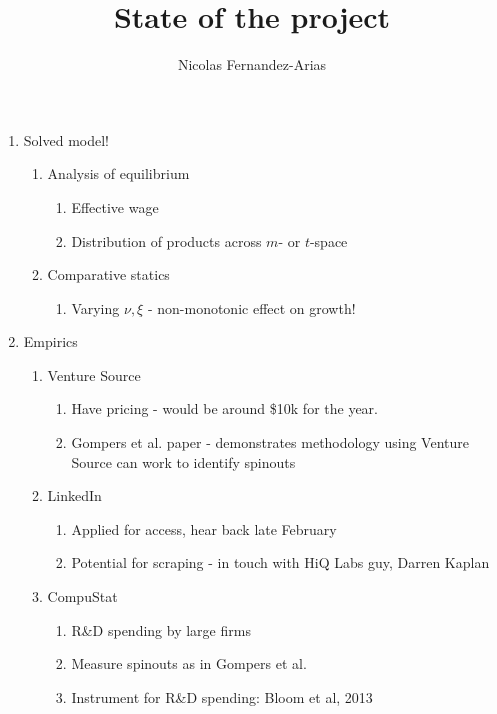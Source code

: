 \documentclass[12pt,english]{article}
\theoremstyle{remark}
\begin{document}
	
\title{State of the project}
\author{Nicolas Fernandez-Arias}
\maketitle


\begin{enumerate}
	\item Solved model!
	\begin{enumerate}
		\item Analysis of equilibrium
		\begin{enumerate}
			\item Effective wage
			\item Distribution of products across $m$- or $t$-space
		\end{enumerate} 
		\item Comparative statics
		\begin{enumerate}
			\item Varying $\nu,\xi$ - non-monotonic effect on growth! 
		\end{enumerate}
	\end{enumerate} 
	\item Empirics 
	\begin{enumerate}
		\item Venture Source 
		\begin{enumerate}
			\item Have pricing - would be around \$10k for the year.
			\item Gompers et al. paper - demonstrates methodology using Venture Source can work to identify spinouts
		\end{enumerate}
		\item LinkedIn
		\begin{enumerate}
			\item Applied for access, hear back late February
			\item Potential for scraping - in touch with HiQ Labs guy, Darren Kaplan
		\end{enumerate}
		\item CompuStat
		\begin{enumerate}
			\item R\&D spending by large firms
			\item Measure spinouts as in Gompers et al.
			\item Instrument for R\&D spending: Bloom et al, 2013
		\end{enumerate}
	\end{enumerate}
\end{enumerate}
\end{document}
